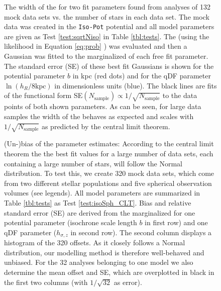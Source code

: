

\begin{figure}
\caption{The width of the \pdf{} for two fit parameters found from analyses of 132 mock data sets vs. the number of stars in each data set. The mock data was created in the \texttt{Iso-Pot} potential and all model parameters are given as Test \ref{test:sqrtNiso} in Table \ref{tbl:tests}. The \pdf{} (using the likelihood in Equation \ref{eq:prob} \Wilma{[TO DO: CHECK]}) was evaluated and then a Gaussian was fitted to the marginalized \pdf{} of each free fit parameter. The standard error (SE) of these best fit Gaussians is shown for the potential parameter $b$ in kpc (red dots) and for the qDF parameter $\ln(h_R/8\text{kpc})$ in dimensionless units (blue). The black lines are fits of the functional form SE$(N_\text{sample}) \propto 1/\sqrt{N_\text{sample}}$ to the data points of both shown parameters. As can be seen, for large data samples the width of the \pdf{} behaves as expected and scales with $1/\sqrt{N_\text{sample}}$ as predicted by the central limit theorem.} 
\label{fig:sqrtNiso}
\end{figure}




\begin{figure}
\caption{(Un-)bias of the parameter estimates: According to the central limit theorem the the best fit values for a large number of data sets, each containing a large number of stars, will follow the Normal distribution. To test this, we create 320 mock data sets, which come from two different stellar populations and five spherical observation volumes (see legends). All model parameters are summarized in Table \ref{tbl:tests} as Test \ref{test:isoSph_CLT}. Bias and relative standard error (SE) are derived from the marginalized \pdf{} for one potential parameter (isochrone scale length $b$ in first row) and one qDF parameter ($h_{\sigma,z}$ in second row). The second column displays a histogram of the 320 offsets. As it closely follows a Normal distribution, our modelling method is therefore well-behaved and unbiased. For the 32 analyses belonging to one model we also determine the mean offset and SE, which are overplotted in black in the first two columns (with $1/\sqrt{32}$ as error).   }
\label{fig:isoSph_CLT}
\end{figure}

